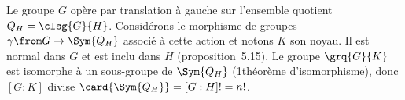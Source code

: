 Le groupe $G$ opère par translation à gauche sur l'ensemble quotient $Q_H = \smash{\clsg{G}{H}}$.
Considérons le morphisme de groupes $\gamma\from G\to\Sym{Q_H}$ associé à cette action et notons $K$ son noyau. 
Il est normal dans $G$ et est inclu dans $H$ (proposition~5.15).
Le groupe $\grq{G}{K}$ est isomorphe à un sous-groupe de $\Sym{Q_H}$ (1\ier théorème d'isomorphisme), donc $[G:K]$ divise $\card{\Sym{Q_H}} = [G:H]! = n!$.
